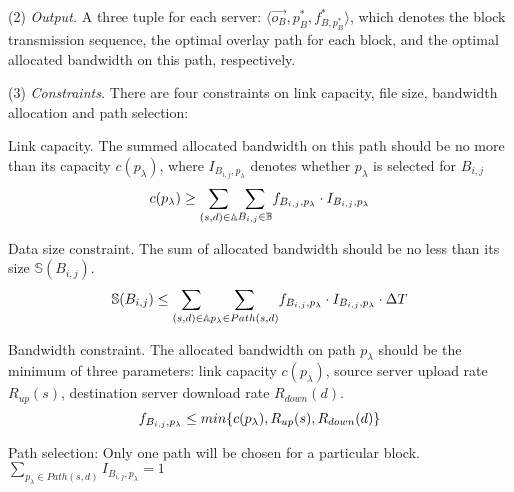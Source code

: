\noindent(2) {\em Output.} A three tuple for each server: $\langle \overrightarrow{o_B}, p_{B}^*, f^*_{B,p_{B}^*} \rangle$, which denotes the block transmission sequence, the optimal overlay path for each block, and the optimal allocated bandwidth on this path, respectively.

\noindent(3) {\em Constraints.}
There are four constraints on link capacity, file size, bandwidth allocation and path selection:

\begin{packeditemize}
\item Link capacity. The summed allocated bandwidth on this path should be no more than its capacity $c(p_\lambda)$, where $I_{B_{i,j},p_\lambda}$ denotes whether $p_\lambda$ is selected for $B_{i,j}$
\begin{equation}
c(p_\lambda) \geq  \displaystyle{\sum_{(s,d)\in \mathbb{A}}} \displaystyle{\sum_{B_{i,j} \in \mathbb{B}}} f_{B_{i,j},p_\lambda} \cdot I_{B_{i,j},p_\lambda}\\
\end{equation}

\item Data size constraint. The sum of allocated bandwidth should be no less than its size $\mathbb{S}(B_{i,j})$.
\begin{equation}
\mathbb{S}(B_{i,j}) \leq  \displaystyle{\sum_{(s,d)\in \mathbb{A}}} \displaystyle{\sum_{p_{\lambda}\in Path(s,d)}} f_{B_{i,j},p_\lambda} \cdot I_{B_{i,j},p_\lambda} \cdot \Delta T\\
\end{equation}

\item Bandwidth constraint. The allocated bandwidth on path $p_\lambda$ should be the minimum of three parameters: link capacity $c(p_\lambda)$, source server upload rate $R_{up}(s)$, destination server download rate $R_{down}(d)$.
\begin{equation}
f_{B_{i,j},p_\lambda} \leq  min \{c(p_\lambda),R_{up}(s),R_{down}(d)\}\\
\end{equation}

\item Path selection: Only one path will be chosen for a particular block.
$\displaystyle{\sum_{p_\lambda \in Path(s,d)}} I_{B_{i,j},p_\lambda} = 1$
\end{packeditemize}
